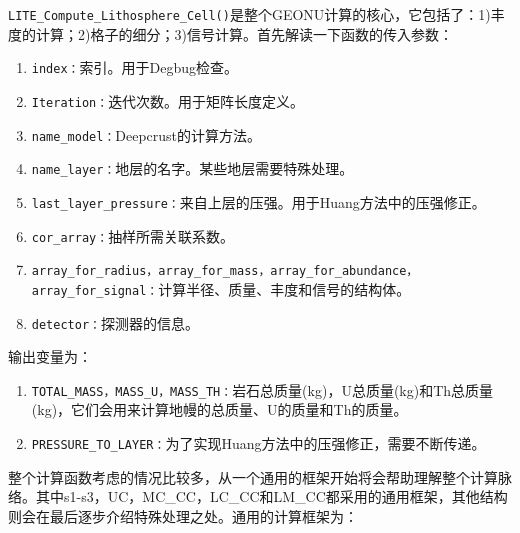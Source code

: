 			\texttt{LITE\_Compute\_Lithosphere\_Cell()}是整个GEONU计算的核心，它包括了：1)丰度的计算；2)格子的细分；3)信号计算。首先解读一下函数的传入参数：
				\begin{enumerate}
					\item \texttt{index：}索引。用于Degbug检查。
					\item \texttt{Iteration：}迭代次数。用于矩阵长度定义。
					\item \texttt{name\_model：}Deepcrust的计算方法。
					\item \texttt{name\_layer：}地层的名字。某些地层需要特殊处理。
					\item \texttt{last\_layer\_pressure：}来自上层的压强。用于Huang方法中的压强修正。
					\item \texttt{cor\_array：}抽样所需关联系数。
					\item \texttt{array\_for\_radius，array\_for\_mass，array\_for\_abundance，array\_for\_signal：}计算半径、质量、丰度和信号的结构体。
					\item \texttt{detector：}探测器的信息。
				\end{enumerate}
			输出变量为：
				\begin{enumerate}
					\item \texttt{TOTAL\_MASS，MASS\_U，MASS\_TH：}岩石总质量(kg)，U总质量(kg)和Th总质量(kg)，它们会用来计算地幔的总质量、U的质量和Th的质量。
					\item \texttt{PRESSURE\_TO\_LAYER：}为了实现Huang方法中的压强修正，需要不断传递。
				\end{enumerate}
			整个计算函数考虑的情况比较多，从一个通用的框架开始将会帮助理解整个计算脉络。其中s1-s3，UC，MC\_CC，LC\_CC和LM\_CC都采用的通用框架，其他结构则会在最后逐步介绍特殊处理之处。通用的计算框架为：
